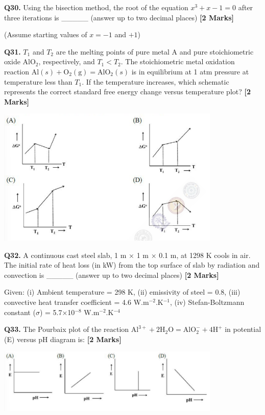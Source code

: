 \documentclass[11pt]{article}
\newcommand{\questionb}[2]{
    \noindent\textbf{Q#2.} #1 \hfill \textbf{[2 Marks]}
}
\begin{document}
\questionb{Using the bisection method, the root of the equation \(x^3 + x - 1 = 0\) after three iterations is \_\_\_\_\_ (answer up to two decimal places)}{30}
(Assume starting values of \(x = -1\) and \(+1\))
\vspace{0.5cm}

\questionb{\( T_1 \) and \( T_2 \) are the melting points of pure metal A and pure stoichiometric oxide \( \text{AlO}_2 \), respectively, and \( T_1 < T_2 \). The stoichiometric metal oxidation reaction \( \text{Al}(s) + \text{O}_2 (\text{g}) = \text{AlO}_2 (s) \) is in equilibrium at 1 atm pressure at temperature less than \( T_1 \). If the temperature increases, which schematic represents the correct standard free energy change versus temperature plot?}{31}
\begin{center}
\includegraphics[width=0.8\textwidth]{figures/31.png}
\end{center}
\vspace{0.5cm}

\questionb{A continuous cast steel slab, 1 m × 1 m × 0.1 m, at 1298 K cools in air. The initial rate of heat loss (in kW) from the top surface of slab by radiation and convection is \_\_\_\_\_ (answer up to two decimal places)}{32}
Given: (i) Ambient temperature = 298 K, (ii) emissivity of steel = 0.8, (iii) convective heat transfer coefficient = 4.6 W.m\(^{-2}\).K\(^{-1}\), (iv) Stefan-Boltzmann constant (\(\sigma\)) = 5.7×10\(^{-8}\) W.m\(^{-2}\).K\(^{-4}\)
\vspace{0.5cm}

\questionb{The Pourbaix plot of the reaction \( \text{Al}^{3+} + 2\text{H}_2\text{O} = \text{AlO}_2^- + 4\text{H}^+ \) in potential (E) versus pH diagram is:}{33}
\begin{center}
\includegraphics[width=0.8\textwidth]{figures/33.png}
\end{center}
\vspace{0.5cm}
\end{document}
